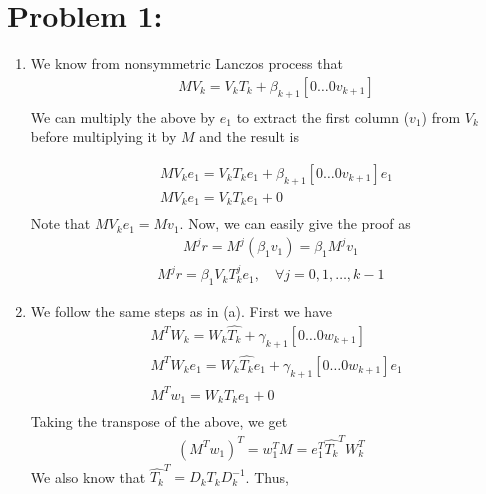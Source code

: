 \section*{Problem 1:}
\begin{enumerate}
\item
We know from nonsymmetric Lanczos process that 
\begin{align*}
&MV_{k} = V_{k}T_{k} + \beta_{k+1}[0 \dots 0 v_{k+1}] \\
\end{align*}
We can multiply the above by $e_{1}$ to extract the first column ($v_{1}$) from $V_{k}$ before multiplying it by $M$ and the result is 

\begin{align*}
&MV_{k}e_{1} = V_{k}T_{k}e_{1} + \beta_{k+1}[0 \dots 0 v_{k+1}]e_{1} \\
& MV_{k}e_{1} = V_{k}T_{k}e_{1} + 0\\
\end{align*}
Note that $MV_{k}e_{1} = Mv_{1}$.  Now, we can easily give the proof as 
\begin{align*}
M^{j}r = M^{j}(\beta_{1}v_{1}) = \beta_{1}M^{j}v_{1}
\end{align*}
\begin{align}
M^{j}r = \beta_{1}V_{k}T_{k}^{j}e_{1}, \quad \forall j=0,1,\dots, k-1
\label{eq:Mr}
\end{align}



\item We follow the same steps as in (a). First we have 
\begin{align*}
& M^{T}W_{k} = W_{k}\hat{T_{k}} + \gamma_{k+1}[0 \dots 0 w_{k+1}]\\
& M^{T}W_{k}e_{1} = W_{k}\hat{T_{k}}e_{1} + \gamma_{k+1}[0 \dots 0 w_{k+1}]e_{1}\\
& M^{T}w_{1} = W_{k}\hat{T_{k}}e_{1} + 0\\
\end{align*}
Taking the transpose of the above, we get 
\begin{align*}
(M^{T}w_{1})^{T} = w_{1}^{T}M = e_{1}^{T}\hat{T_{k}}^{T}W_{k}^{T}
\end{align*}
We also know that $\hat{T_{k}}^{T} = D_{k}T_{k}D^{-1}_{k}$. Thus, 


\end{enumerate}
